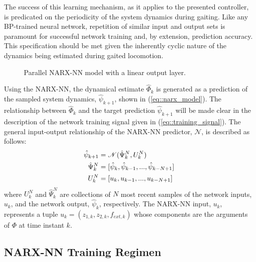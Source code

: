 The success of this learning mechanism, as it applies to the presented controller, is predicated on the periodicity of the system dynamics during gaiting. Like any BP-trained neural network, repetition of similar input and output sets is paramount for successful network training and, by extension, prediction accuracy. This specification should be met given the inherently cyclic nature of the dynamics being estimated during gaited locomotion. 
	\begin{figure}[t!]
		\centering
		\caption{Parallel NARX-NN model with a linear output layer.}
		\label{fig::narx_net}
		\vspace{-5.5mm}
	\end{figure}
Using the NARX-NN, the dynamical estimate $\hat{\Phi}_{k}$ is generated as a prediction of the sampled system dynamics, $\hat{\psi}_{k+1}$, shown in (\ref{eq::narx_model}). The relationship between $\hat{\Phi}_{k}$ and the target prediction $\hat{\psi}_{k+1}$ will be made clear in the description of the network training signal given in (\ref{eq::training_signal}). The general input-output relationship of the NARX-NN predictor, $\mathscr{N}$, is described as follows:
	\begin{equation}
		\vspace{-1.5mm}
		\begin{split}
		\hat{\psi}_{k+1}	&= \mathscr{N}(\hat{\Psi}_{k}^{N},{U}_{k}^{N}) \\
		\hat{\Psi}_{k}^{N}	&= [\hat{\psi}_{k},\hat{\psi}_{k-1},...,\hat{\psi}_{k-N+1}]  \\
		{U}_{k}^{N}			&= [u_{k}   ,u_{k-1}   ,...,u_{k-N+1}   ]
		\end{split}
		\label{eq::narx_model}
	\end{equation}
where ${U}_{k}^{N}$  and $\hat{\Psi}_{k}^{N}$ are collections of $N$ most recent samples of the network inputs, $u_{k}$, and the network output, $\hat{\psi}_{k}$, respectively. The NARX-NN input, $u_{k}$, represents a tuple $u_{k} = (z_{1,k}, z_{2,k}, f_{ext,k})$ whose components are the arguments of $\Phi$ at time instant $k$. 



\subsection{NARX-NN Training Regimen}
	

